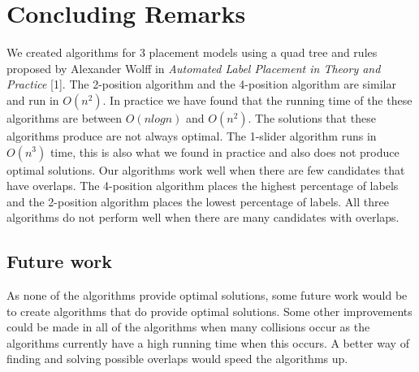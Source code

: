 \documentclass[crop=false,a4paper,oneside,11pt]{standalone}
\begin{document}
\section{Concluding Remarks}
We created algorithms for 3 placement models using a quad tree and rules proposed by Alexander Wolff in \emph{Automated Label Placement in Theory and Practice} [1]. The 2-position algorithm and the 4-position algorithm are similar and run in $O(n^2)$. In practice we have found that the running time of the these algorithms are between $O(nlogn)$ and $O(n^2)$. The solutions that these algorithms produce are not always optimal. The 1-slider algorithm runs in $O(n^3)$ time, this is also what we found in practice and also does not produce optimal solutions. Our algorithms work well when there are few candidates that have overlaps. The 4-position algorithm places the highest percentage of labels and the 2-position algorithm places the lowest percentage of labels. All three algorithms do not perform well when there are many candidates with overlaps.

\subsection{Future work}
As none of the algorithms provide optimal solutions, some future work would be to create algorithms that do provide optimal solutions. Some other improvements could be made in all of the algorithms when many collisions occur as the algorithms currently have a high running time when this occurs. A better way of finding and solving possible overlaps would speed the algorithms up.
\end{document}
